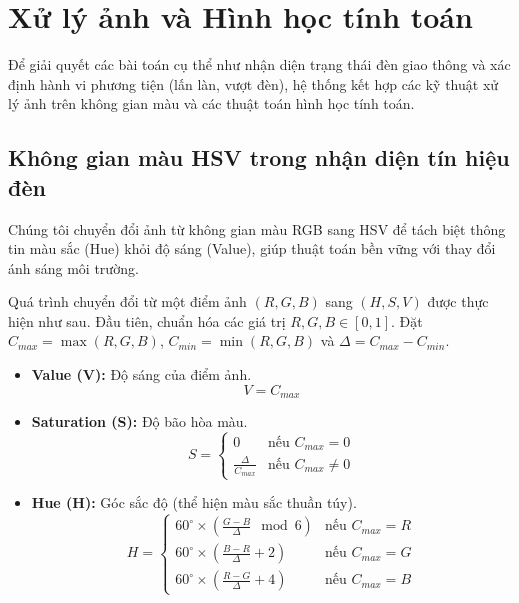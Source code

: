 \section{Xử lý ảnh và Hình học tính toán}
\label{sec:cv_geometry}

Để giải quyết các bài toán cụ thể như nhận diện trạng thái đèn giao thông và xác định hành vi phương tiện (lấn làn, vượt đèn), hệ thống kết hợp các kỹ thuật xử lý ảnh trên không gian màu và các thuật toán hình học tính toán.

\subsection{Không gian màu HSV trong nhận diện tín hiệu đèn}
Chúng tôi chuyển đổi ảnh từ không gian màu RGB sang HSV để tách biệt thông tin màu sắc (Hue) khỏi độ sáng (Value), giúp thuật toán bền vững với thay đổi ánh sáng môi trường.

Quá trình chuyển đổi từ một điểm ảnh $(R, G, B)$ sang $(H, S, V)$ được thực hiện như sau. Đầu tiên, chuẩn hóa các giá trị $R, G, B \in [0, 1]$. Đặt $C_{max} = \max(R, G, B)$, $C_{min} = \min(R, G, B)$ và $\Delta = C_{max} - C_{min}$.

\begin{itemize}
    \item \textbf{Value (V):} Độ sáng của điểm ảnh.
    \begin{equation}
        V = C_{max}
    \end{equation}
    \item \textbf{Saturation (S):} Độ bão hòa màu.
    \begin{equation}
        S = \begin{cases}
            0 & \text{nếu } C_{max} = 0 \\
            \frac{\Delta}{C_{max}} & \text{nếu } C_{max} \neq 0
        \end{cases}
    \end{equation}
    \item \textbf{Hue (H):} Góc sắc độ (thể hiện màu sắc thuần túy).
    \begin{equation}
        H = \begin{cases}
            60^\circ \times (\frac{G - B}{\Delta} \mod 6) & \text{nếu } C_{max} = R \\
            60^\circ \times (\frac{B - R}{\Delta} + 2) & \text{nếu } C_{max} = G \\
            60^\circ \times (\frac{R - G}{\Delta} + 4) & \text{nếu } C_{max} = B
        \end{cases}
    \end{equation}
\end{itemize}

